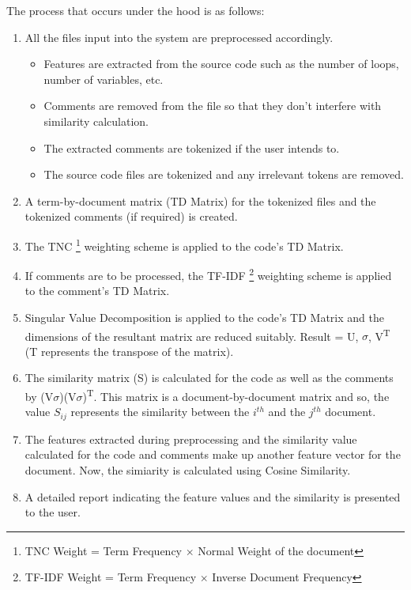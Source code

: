 \documentclass[12pt]{article}
\begin{document}
The process that occurs under the hood is as follows:
\begin{enumerate}
    \item All the files input into the system are preprocessed accordingly.
    \begin{itemize}
        \item Features are extracted from the source code such as the number of loops, number of variables, etc.
        \item Comments are removed from the file so that they don't interfere with similarity calculation.
        \item The extracted comments are tokenized if the user intends to.
        \item The source code files are tokenized and any irrelevant tokens are removed.
    \end{itemize}
    \item A term-by-document matrix (TD Matrix) for the tokenized files and the tokenized comments (if required) is created.
    \item The TNC \footnote{TNC Weight = Term Frequency $\times$ Normal Weight of the document} weighting scheme is applied to the code's TD Matrix.
    \item If comments are to be processed, the TF-IDF \footnote{TF-IDF Weight = Term Frequency $\times$ Inverse Document Frequency} weighting scheme is applied to the comment's TD Matrix.
    \item Singular Value Decomposition is applied to the code's TD Matrix and the dimensions of the resultant matrix are reduced suitably. Result = U, $\sigma$, V\textsuperscript{T} (T represents the transpose of the matrix).
    \item The similarity matrix (S) is calculated for the code as well as the comments by (V$\sigma$)(V$\sigma$)\textsuperscript{T}. This matrix is a document-by-document matrix and so, the value $S_{ij}$ represents the similarity between the $i^{th}$ and the $j^{th}$ document.
    \item The features extracted during preprocessing and the similarity value calculated for the code and comments make up another feature vector for the document. Now, the simiarity is calculated using Cosine Similarity.
    \item A detailed report indicating the feature values and the similarity is presented to the user.
\end{enumerate}

\end{document}
